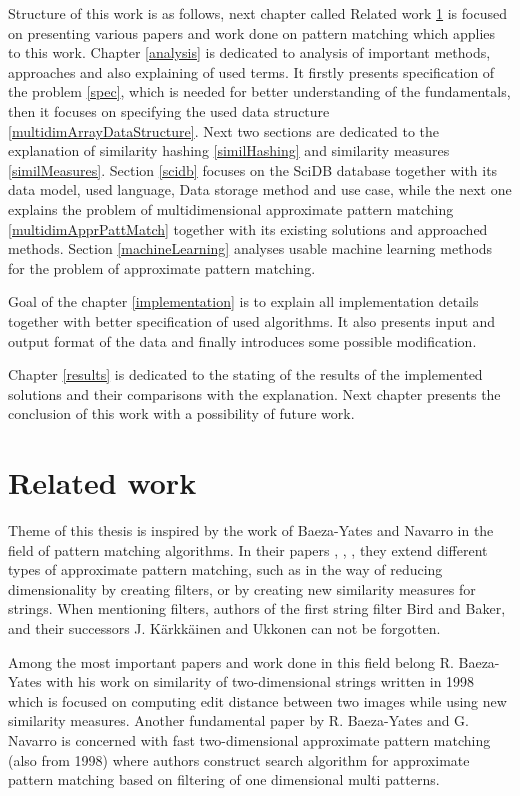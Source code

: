 Structure of this work is as follows, next chapter called Related work \ref{relatedWork} is focused on presenting various papers and work done on pattern matching which applies to this work. Chapter \ref{analysis} is dedicated to analysis of important methods, approaches and also explaining of used terms. It firstly presents specification of the problem \ref{spec}, which is needed for better understanding of the fundamentals, then it focuses on specifying the used data structure \ref{multidimArrayDataStructure}. Next two sections are dedicated to the explanation of similarity hashing \ref{similHashing} and similarity measures \ref{similMeasures}. Section \ref{scidb} focuses on the SciDB database together with its data model, used language, Data storage method and use case, while the next one explains the problem of multidimensional approximate pattern matching 
\ref{multidimApprPattMatch} together with its existing solutions and approached methods. Section \ref{machineLearning} analyses usable machine learning methods for the problem of approximate pattern matching.

Goal of the chapter \ref{implementation} is to explain all implementation details together with better specification of used algorithms. It also presents input and output format of the data and finally introduces some possible modification.

Chapter \ref{results} is dedicated to the stating of the results of the implemented solutions and their comparisons with the explanation. Next chapter presents the conclusion of this work with a possibility of future work. 

\chapter{Related work} \label{relatedWork}
Theme of this thesis is inspired by the work of Baeza-Yates and Navarro in the field of pattern matching algorithms. In their papers \cite{mdApproxPM}, \cite{fast2DapproxPM}, \cite{fastMDApproxPM}, they extend different types of approximate pattern matching, such as in the way of reducing dimensionality by creating filters, or by creating new similarity measures for strings. When mentioning filters, authors of the first string filter Bird and Baker, and their successors J. K{\" a}rkk{\" a}inen and Ukkonen can not be forgotten.

Among the most important papers and work done in this field belong R. Baeza-Yates with his work on similarity of two-dimensional strings written in 1998 \cite{sim2Dstrings} which is focused on computing edit distance between two images while using new similarity measures. Another fundamental paper by R. Baeza-Yates and G. Navarro \cite{fast2DapproxPM} is concerned with fast two-dimensional approximate pattern matching (also from 1998) where authors construct search algorithm for approximate pattern matching based on filtering of one dimensional multi patterns.

